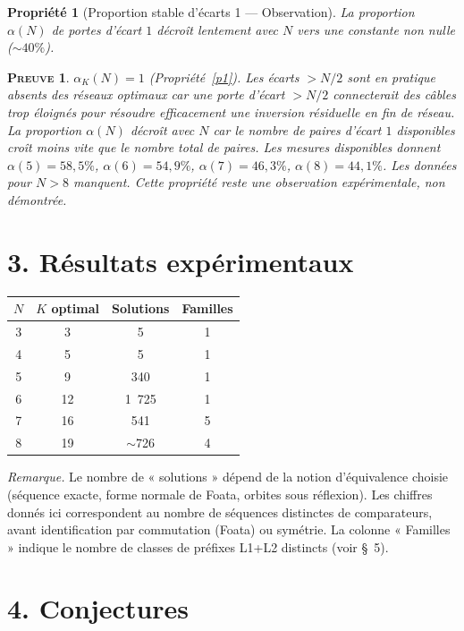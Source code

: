 \documentclass[11pt,a4paper]{article}
\theoremstyle{propretheoreme}
\newtheorem{propriete}{Propriété}
\theoremstyle{proprepreuve}
\newtheorem*{preuve}{\small\textsc{Preuve}}
\theoremstyle{proprecorollaire}
\begin{document}
\begin{propriete}[Proportion stable d'écarts 1 --- Observation]\label{p9}
La proportion $\alpha(N)$ de portes d'écart $1$ décroît lentement avec $N$ vers une constante non nulle ($\sim40\%$).
\end{propriete}

\begin{preuve}
$\alpha_K(N) = 1$ (Propriété~\ref{p1}). Les écarts $>N/2$ sont en pratique absents des réseaux optimaux car une porte d'écart $>N/2$ connecterait des câbles trop éloignés pour résoudre efficacement une inversion résiduelle en fin de réseau. La proportion $\alpha(N)$ décroît avec $N$ car le nombre de paires d'écart $1$ disponibles croît moins vite que le nombre total de paires. Les mesures disponibles donnent $\alpha(5)=58,5\%$, $\alpha(6)=54,9\%$, $\alpha(7)=46,3\%$, $\alpha(8)=44,1\%$. Les données pour $N>8$ manquent. Cette propriété reste une observation expérimentale, non démontrée.
\end{preuve}

\section*{3. Résultats expérimentaux}

\medskip
\begin{center}
\begin{tabular}{cccc}
\toprule
$N$ & $K$ optimal & Solutions & Familles \\
\midrule
3 & 3 & 5 & 1 \\
4 & 5 & 5 & 1 \\
5 & 9 & 340 & 1 \\
6 & 12 & 1~725 & 1 \\
7 & 16 & 541 & 5 \\
8 & 19 & $\sim$726 & 4 \\
\bottomrule
\end{tabular}

\smallskip
\noindent\textit{Remarque.} Le nombre de « solutions » dépend de la notion d'équivalence choisie (séquence exacte, forme normale de Foata, orbites sous réflexion). Les chiffres donnés ici correspondent au nombre de séquences distinctes de comparateurs, avant identification par commutation (Foata) ou symétrie. La colonne « Familles » indique le nombre de classes de préfixes L1+L2 distincts (voir §~5).
\end{center}

\section*{4. Conjectures}
\end{document}

